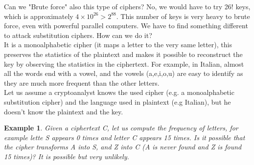 \documentclass[a4paper, 12pt]{report}
\newtheorem{example}{\textbf{Example}}
\begin{document}
Can we "Brute force" also this type of ciphers? No, we would have to try 26! keys, which is approximately $4\times10^{26}>2^{88}$. This number of keys is very heavy to brute force, even with powerful parallel computers. We have to find something different to attack substitution ciphers. How can we do it?\\

It is a monoalphabetic cipher (it maps a letter to the very same letter), this preserves the statistics of the plaintext and makes it possible to reconstruct the key by observing the statistics in the ciphertext. For example, in Italian, almost all the words end with a vowel, and the vowels (a,e,i,o,u) are easy to identify as they are much more frequent than the other letters.\\

Let us assume a cryptoanalyst knows the used cipher (e.g. a monoalphabetic substitution cipher) and the language used in plaintext (e.g Italian), but he doesn't know the plaintext and the key.

\begin{example}
	Given a ciphertext C, let us compute the frequency of letters, for example lette S appears 0 times and letter C appears 15 times. Is it possible that the cipher transforms A into S, and Z into C (A is never found and Z is found 15 times)? It is possible but very unlikely.
\end{example}
\end{document}
